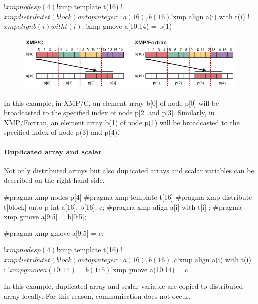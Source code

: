 \begin{XFexample}
!$xmp nodes p(4)
!$xmp template t(16)
!$xmp distribute t(block) onto p
integer :: a(16), b(16)
!$xmp align a(i) with t(i)
!$xmp align b(i) with t(i)
     :
!$xmp gmove
  a(10:14) = b(1)
\end{XFexample}

\begin{figure}
  \centering
  \includegraphics{figs/gmove_one_element.png}
\end{figure}

In this example, in XMP/C, an element array b[0] of node p[0] will be
broadcasted to the specified index of node p[2] and p[3]. Similarly, in
XMP/Fortran, an element array b(1) of node p(1) will be broadcasted to
the specified index of node p(3) and p(4).

\paragraph{Duplicated array and scalar}

Not only distributed arrays but also duplicated arrays and scalar
variables can be described on the right-hand side.

\begin{XCexample}
 #pragma xmp nodes p[4]
 #pragma xmp template t[16]
 #pragma xmp distribute t[block] onto p
 int a[16], b[16], c;
 #pragma xmp align a[i] with t[i]
      :
#pragma xmp gmove
   a[9:5] = b[0:5];

#pragma xmp gmove
   a[9:5] = c;
\end{XCexample}

\begin{XFexample}
 !$xmp nodes p(4)
 !$xmp template t(16)
 !$xmp distribute t(block) onto p
 integer :: a(16), b(16), c
 !$xmp align a(i) with t(i)
      :
!$xmp gmove
   a(10:14) = b(1:5)

!$xmp gmove
   a(10:14) = c
\end{XFexample}

In this example, duplicated array and scalar variable are copied to
distributed array locally. For this reason, communication does not
occur.


